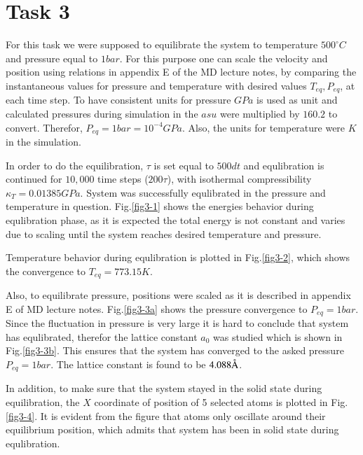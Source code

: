 \section*{Task 3}

For this task we were supposed to equilibrate the system to temperature $500 ^\circ C$ and pressure equal to $1 bar$. For this purpose one can scale the velocity and position using relations in appendix E of the MD lecture notes, by comparing the instantaneous values for pressure and temperature with desired values $T_{eq}, P_{eq}$, at each time step. To have consistent units for pressure $GPa$ is used as unit and calculated pressures during simulation in the $asu$ were multiplied by $160.2$ to convert. Therefor, $P_{eq} = 1 bar = 10^{-4} GPa$. Also, the units for temperature were $K$ in the simulation.

In order to do the equilibration, $\tau$ is set equal to $500 dt$ and equlibration is continued for $10,000$ time steps ($200\tau$), with isothermal compressibility $\kappa_T = 0.01385 GPa$. System was successfully equlibrated in the pressure and temperature in question. Fig.\ref{fig3-1} shows the energies behavior during equlibration phase, as it is expected the total energy is not constant and varies due to scaling until the system reaches desired temperature and pressure.

Temperature behavior during equlibration is plotted in Fig.\ref{fig3-2}, which shows the convergence to $T_{eq} = 773.15K$.

Also, to equilibrate pressure, positions were scaled as it is described in appendix E of MD lecture notes. Fig.\ref{fig3-3a} shows the pressure convergence to $P_{eq} = 1 bar$. Since the fluctuation in pressure is very large it is hard to conclude that system has equlibrated, therefor the lattice constant $a_0$ was studied which is shown in Fig.\ref{fig3-3b}. This ensures that the system has converged to the asked pressure $P_{eq} = 1 bar$. The lattice constant is found to be $4.088\mbox{\normalfont\AA}$.

In addition, to make sure that the system stayed in the solid state during equilibration, the $X$ coordinate of position of 5 selected atoms is plotted in Fig.\ref{fig3-4}. It is evident from the figure that atoms only oscillate around their equilibrium position, which admits that system has been in solid state during equlibration.


